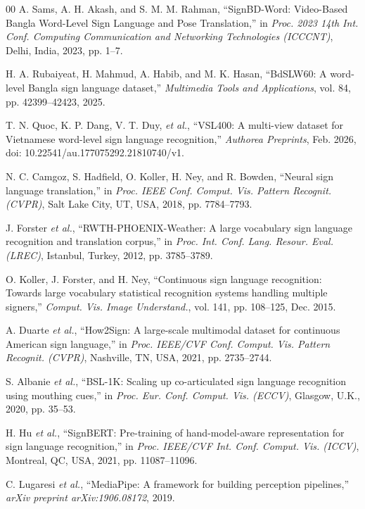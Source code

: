 \documentclass{ieeeaccess}
\begin{document}
\begin{thebibliography}{00}
A. Sams, A. H. Akash, and S. M. M. Rahman, ``SignBD-Word: Video-Based Bangla Word-Level Sign Language and Pose Translation,'' in \emph{Proc. 2023 14th Int. Conf. Computing Communication and Networking Technologies (ICCCNT)}, Delhi, India, 2023, pp. 1--7.

H. A. Rubaiyeat, H. Mahmud, A. Habib, and M. K. Hasan, ``BdSLW60: A word-level Bangla sign language dataset,'' \emph{Multimedia Tools and Applications}, vol. 84, pp. 42399--42423, 2025.

T. N. Quoc, K. P. Dang, V. T. Duy, \emph{et al.}, ``VSL400: A multi-view dataset for Vietnamese word-level sign language recognition,'' \emph{Authorea Preprints}, Feb. 2026, doi: 10.22541/au.177075292.21810740/v1.

N. C. Camgoz, S. Hadfield, O. Koller, H. Ney, and R. Bowden, ``Neural sign language translation,'' in \emph{Proc. IEEE Conf. Comput. Vis. Pattern Recognit. (CVPR)}, Salt Lake City, UT, USA, 2018, pp. 7784--7793.

J. Forster \emph{et al.}, ``RWTH-PHOENIX-Weather: A large vocabulary sign language recognition and translation corpus,'' in \emph{Proc. Int. Conf. Lang. Resour. Eval. (LREC)}, Istanbul, Turkey, 2012, pp. 3785--3789.

O. Koller, J. Forster, and H. Ney, ``Continuous sign language recognition: Towards large vocabulary statistical recognition systems handling multiple signers,'' \emph{Comput. Vis. Image Understand.}, vol. 141, pp. 108--125, Dec. 2015.

A. Duarte \emph{et al.}, ``How2Sign: A large-scale multimodal dataset for continuous American sign language,'' in \emph{Proc. IEEE/CVF Conf. Comput. Vis. Pattern Recognit. (CVPR)}, Nashville, TN, USA, 2021, pp. 2735--2744.

S. Albanie \emph{et al.}, ``BSL-1K: Scaling up co-articulated sign language recognition using mouthing cues,'' in \emph{Proc. Eur. Conf. Comput. Vis. (ECCV)}, Glasgow, U.K., 2020, pp. 35--53.

H. Hu \emph{et al.}, ``SignBERT: Pre-training of hand-model-aware representation for sign language recognition,'' in \emph{Proc. IEEE/CVF Int. Conf. Comput. Vis. (ICCV)}, Montreal, QC, USA, 2021, pp. 11087--11096.

C. Lugaresi \emph{et al.}, ``MediaPipe: A framework for building perception pipelines,'' \emph{arXiv preprint arXiv:1906.08172}, 2019.


\end{thebibliography}
\end{document}
